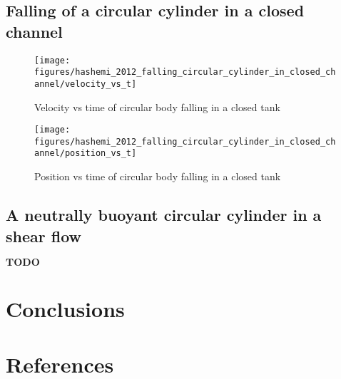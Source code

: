 \documentclass[preprint,12pt]{elsarticle}
\newcommand{\ten}[1]{\ensuremath{\mathbf{#1}}}
\begin{document}
\FloatBarrier%
\subsection{Falling of a circular cylinder in a closed channel}
\label{sec:res:hpf}


\citet{hashemi_modified_2012}

\begin{figure}[!htpb]
  \centering
  \texttt{[image: figures/hashemi\_2012\_falling\_circular\_cylinder\_in\_closed\_channel/velocity\_vs\_t]}
  \caption{Velocity vs time of circular body falling in a closed tank}
\label{fig:xxxx}
\end{figure}

\begin{figure}[!htpb]
  \centering
  \texttt{[image: figures/hashemi\_2012\_falling\_circular\_cylinder\_in\_closed\_channel/position\_vs\_t]}
  \caption{Position vs time of circular body falling in a closed tank}
\label{fig:xxxx}
\end{figure}


\FloatBarrier%
\subsection{A neutrally buoyant circular cylinder in a shear ﬂow}
\label{sec:res:hpf}
\citet{hashemi_modified_2012}

\ten{TODO}



\FloatBarrier%
\section{Conclusions}
\label{sec:conclusions}


\section*{References}




\end{document}
